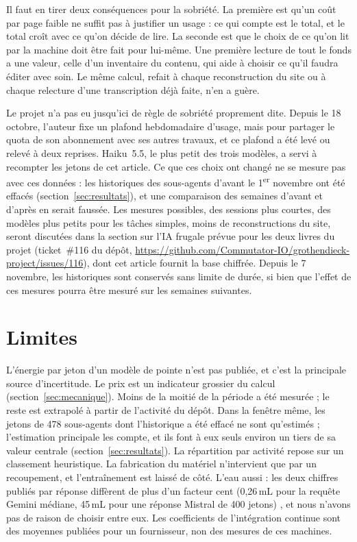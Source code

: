 \documentclass[11pt,a4paper]{article}
\begin{document}
Il faut en tirer deux conséquences pour la sobriété. La première est qu'un coût par page faible ne suffit pas à justifier un usage : ce qui compte est le total, et le total croît avec ce qu'on décide de lire. La seconde est que le choix de ce qu'on lit par la machine doit être fait pour lui-même. Une première lecture de tout le fonds a une valeur, celle d'un inventaire du contenu, qui aide à choisir ce qu'il faudra éditer avec soin. Le même calcul, refait à chaque reconstruction du site ou à chaque relecture d'une transcription déjà faite, n'en a guère.

Le projet n'a pas eu jusqu'ici de règle de sobriété proprement dite. Depuis le 18 octobre, l'auteur fixe un plafond hebdomadaire d'usage, mais pour partager le quota de son abonnement avec ses autres travaux, et ce plafond a été levé ou relevé à deux reprises. Haiku~5.5, le plus petit des trois modèles, a servi à recompter les jetons de cet article. Ce que ces choix ont changé ne se mesure pas avec ces données : les historiques des sous-agents d'avant le 1\textsuperscript{er} novembre ont été effacés (section~\ref{sec:resultats}), et une comparaison des semaines d'avant et d'après en serait faussée. Les mesures possibles, des sessions plus courtes, des modèles plus petits pour les tâches simples, moins de reconstructions du site, seront discutées dans la section sur l'IA frugale prévue pour les deux livres du projet (ticket~\#116 du dépôt, \url{https://github.com/Commutator-IO/grothendieck-project/issues/116}), dont cet article fournit la base chiffrée. Depuis le 7 novembre, les historiques sont conservés sans limite de durée, si bien que l'effet de ces mesures pourra être mesuré sur les semaines suivantes.

\section{Limites}

L'énergie par jeton d'un modèle de pointe n'est pas publiée, et c'est la principale source d'incertitude. Le prix est un indicateur grossier du calcul (section~\ref{sec:mecanique}). Moins de la moitié de la période a été mesurée ; le reste est extrapolé à partir de l'activité du dépôt. Dans la fenêtre même, les jetons de 478 sous-agents dont l'historique a été effacé ne sont qu'estimés ; l'estimation principale les compte, et ils font à eux seuls environ un tiers de sa valeur centrale (section~\ref{sec:resultats}). La répartition par activité repose sur un classement heuristique. La fabrication du matériel n'intervient que par un recoupement, et l'entraînement est laissé de côté. L'eau aussi : les deux chiffres publiés par réponse diffèrent de plus d'un facteur cent (0,26\,mL pour la requête Gemini médiane, 45\,mL pour une réponse Mistral de 400 jetons) \citep{elsworth2025,mistral2025}, et nous n'avons pas de raison de choisir entre eux. Les coefficients de l'intégration continue sont des moyennes publiées pour un fournisseur, non des mesures de ces machines.
\end{document}
